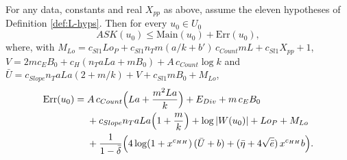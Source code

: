 
\begin{theorem}\label{pn:P021}

For any data, constants and real $X_{pp}$ as above, assume the eleven hypotheses of Definition \ref{def:L-hyps}. Then for every $u_0\in U_0$
\[
  ASK(u_0)\le\mathrm{Main}(u_0)+\mathrm{Err}(u_0),
\]
where, with
$M_{Lo}=c_{Sl1}Lo_P+c_{Sl1}n_Tm(a/k+b')\,c_{Count}mL+c_{Sl1}X_{pp}+1$,
$V=2mc_EB_0+c_H(n_TaLa+mB_0)+A\,c_{Count}\log k$ and
$\bar U=c_{Slope}n_TaLa(2+m/k)+V+c_{Sl1}mB_0+M_{Lo}$,
\[
\begin{aligned}
 \mathrm{Err}(u_0)={}&A\,c_{Count}\Bigl(La+\frac{m^2La}{k}\Bigr)+E_{Div}+m\,c_EB_0\\
 &+c_{Slope}n_TaLa\Bigl(1+\frac mk\Bigr)+\log|W(u_0)|+Lo_P+M_{Lo}\\
 &+\frac1{1-\bar\delta}\Bigl(4\log(1+x^{c_{HH}})\,(\bar U+b)+(\bar\eta+4\sqrt{\bar e})\,x^{c_{HH}}b\Bigr).
\end{aligned}
\]
\end{theorem}
